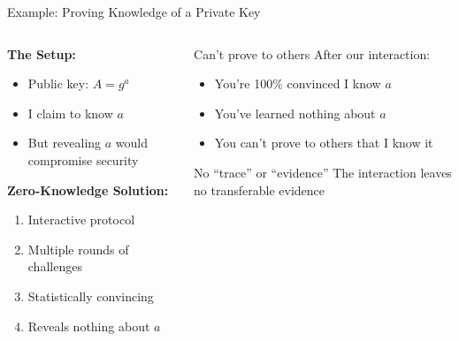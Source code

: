 \documentclass[aspectratio=169, lualatex, handout]{beamer}
\begin{document}
\begin{frame}{Example: Proving Knowledge of a Private Key}
	\begin{columns}[c]
		\begin{column}{0.5\textwidth}
			\textbf{The Setup:}
			\begin{itemize}
				\item Public key: $A = g^{a}$
				\item I claim to know $a$
				\item But revealing $a$ would compromise security
			\end{itemize}
			\vspace{0.5em}
			\textbf{Zero-Knowledge Solution:}
			\begin{enumerate}
				\item Interactive protocol
				\item Multiple rounds of challenges
				\item Statistically convincing
				\item Reveals nothing about $a$
			\end{enumerate}
		\end{column}
		\begin{column}{0.5\textwidth}
			\begin{alertblock}{Can't prove to others}
				After our interaction:
				\begin{itemize}
					\item You're 100\% convinced I know $a$
					\item You've learned nothing about $a$
					\item You can't prove to others that I know it
				\end{itemize}
			\end{alertblock}
			\vspace{0.5em}
			\begin{exampleblock}{No ``trace'' or ``evidence''}
				The interaction leaves no transferable evidence
			\end{exampleblock}
		\end{column}
	\end{columns}
\end{frame}
\end{document}
